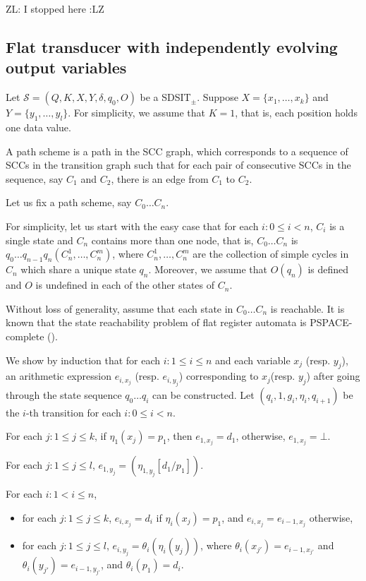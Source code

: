 \documentclass[runningheads,a4paper]{llncs}
\def\Ss{{\mathcal{S} }}
\newcommand{\zhilin}[1]{\color{cyan} {ZL: #1 :LZ} \color{black}}
\newcommand{\SDSIT}{SDSIT}
\begin{document}
\zhilin{I stopped here}


\subsection{Flat transducer with independently evolving output variables}

Let $\Ss=(Q, K, X, Y, \delta, q_0, O)$ be a \SDSIT$_{\pm}$. Suppose $X=\{x_1,\dots,x_k\}$ and $Y=\{y_1,\dots,y_l\}$. For simplicity, we assume that $K = 1$, that is, each position holds one data value.

A path scheme is a path in the SCC graph, which corresponds to a sequence of SCCs in the transition graph such that for each pair of consecutive SCCs in the sequence, say $C_1$ and $C_2$, there is an edge from $C_1$ to $C_2$.

Let us fix a path scheme, say $C_0 \dots C_n$.

For simplicity, let us start with the easy case that for each $i: 0 \le i < n$, $C_i$ is a single state and $C_n$ contains more than one node, that is, $C_0 \dots C_n$ is $q_0 \dots q_{n-1} q_n (C^1_n,\dots,C^m_n)$, where $C^1_{n},\dots, C^m_n$ are the collection of simple cycles in $C_n$ which share a unique state $q_{n}$. Moreover, we assume that $O(q_n)$ is defined and $O$ is undefined in each of the other states of $C_n$.

Without loss of generality, assume that each state in $C_0 \dots C_n$ is reachable. It is known that the state reachability problem of flat register automata is PSPACE-complete (\cite{DL09}). 


We show by induction that for each $i: 1 \le i \le n$ and each variable $x_j$ (resp. $y_j$), an arithmetic expression $e_{i,x_j}$ (resp. $e_{i,y_j}$) corresponding to $x_j$(resp. $y_j$) after going through the state sequence $q_0 \dots q_i$ can be constructed. Let $(q_{i}, 1, g_{i}, \eta_{i}, q_{i+1})$ be the $i$-th transition for each $i: 0 \le i < n$.

For each $j: 1 \le j \le k$, if $\eta_1(x_j)=p_1$, then $e_{1,x_j}=d_1$, otherwise, $e_{1,x_j}=\bot$.

For each $j: 1 \le j \le l$, $e_{1,y_j} = (\eta_{1,y_j}[d_1/p_1])$. 

For each $i: 1 < i \le n$, 
\begin{itemize}
\item for each $j: 1 \le j \le k$, $e_{i,x_j}=d_i$ if $\eta_i(x_j)=p_1$, and $e_{i,x_j}=e_{i-1,x_j}$ otherwise,
%
\item for each $j: 1 \le j \le l$, $e_{i,y_j} = \theta_i(\eta_i(y_j))$, where $\theta_i(x_{j'})=e_{i-1,x_{j'}}$ and $\theta_i(y_{j'})=e_{i-1, y_{j'}}$, and $\theta_i(p_1)=d_i$.
\end{itemize}
\end{document}
